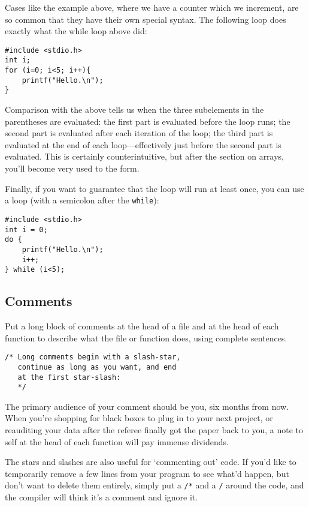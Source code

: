 \documentclass[12pt]{article}
\makeatletter
\def\ttind#1{\index{#1@{\tt #1}}{\tt #1}}
\makeatother
\begin{document}
Cases like the example above, where we have a counter which we increment, are so common that they have
their own special syntax. The following  loop does exactly what the while loop above did:

\begin{verbatim}
#include <stdio.h>
int i;
for (i=0; i<5; i++){
    printf("Hello.\n");
}
\end{verbatim}

Comparison with the above tells us when the three subelements in the parentheses are evaluated: the first
part is evaluated before the loop runs; the second part is evaluated after each iteration of the loop; the
third part is evaluated at the end of each loop---effectively just before the second part is evaluated.
This is certainly counterintuitive, but after the section on arrays, you'll become very used to the form.

Finally, if you want to guarantee that the loop will run at least once, you can use a \ttind{do-while} loop (with a semicolon after the {\tt while}):

\begin{verbatim}
#include <stdio.h>
int i = 0;
do {
    printf("Hello.\n");
    i++;
} while (i<5);
\end{verbatim} 

\subsection{Comments} 
Put a long block of comments 
at the head of a file and at the head of each function to describe what
the file or function does, using complete sentences.
\begin{verbatim}
/* Long comments begin with a slash-star,
   continue as long as you want, and end 
   at the first star-slash:   
   */
\end{verbatim}
The primary audience of your comment should be you, six months from
now. When you're shopping for black boxes to plug in to your next project,
or reauditing your data after the referee finally got the paper back
to you, a note to self at the head of each function will pay immense
dividends.


The stars and slashes are also useful for `commenting out' code. If you'd
like to temporarily remove a few lines from your program to see what'd
happen, but don't want to delete them entirely, simply put a {\tt /*}
and a {\tt */} around the code, and the compiler will think it's a
comment and ignore it.
\end{document}
